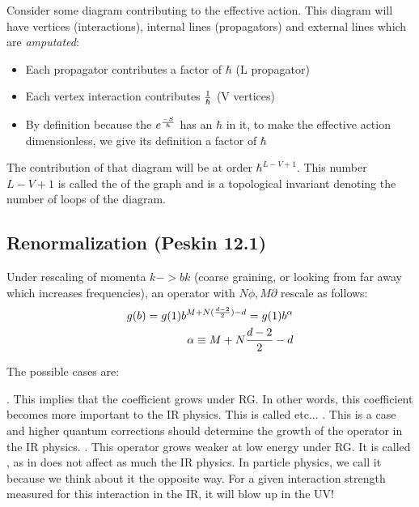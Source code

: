 \documentclass[11pt]{scrartcl}
\begin{document}
Consider some diagram contributing to the effective action.  This diagram will have vertices (interactions), internal lines (propagators) and external lines which are \emph{amputated}:
\begin{itemize}
\item Each propagator contributes a factor of ${\hbar}$ (L propagator)
\item Each vertex interaction contributes ${1 \over \hbar}$ (V vertices)
\item By definition because the $e^{-S \over \hbar}$ has an $\hbar$ in it, to make the effective action dimensionless,
we give its definition a factor of $\hbar$
\end{itemize}

The contribution of that diagram will be at order $\hbar^{L - V +1 }$.  This number $L-V+1$ is called the  of the graph and is a topological invariant denoting the number of loops of the diagram.

\subsection{Renormalization (Peskin 12.1)}

Under rescaling of momenta $k-> bk$ (coarse graining, or looking from far away which increases frequencies), an operator with $N \phi, M \partial$ rescale as follows:
\begin{align}
g(b)  = g(1) b^{M + N({d-2 \over 2})-d} = g(1) b^{\alpha} \\
\alpha \equiv M + N {d-2 \over 2}-d
\end{align}

The possible cases are:
\begin{itemize}
\ii {}.  This implies that the coefficient grows under RG.  In other words, this coefficient becomes more important to the IR physics.  This is called   etc... 
\ii {}.  This is a  case and higher quantum corrections should determine the growth of the operator in the IR physics. 
\ii {}.  This operator grows weaker at low energy under RG. It is called , as in does not affect as much the IR physics.  In particle physics, we 
call it  because we think about it the opposite way.  For a given interaction strength measured for this interaction in the IR, it will blow up in the UV!
\end{itemize}
\end{document}
